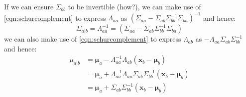 If we can ensure $\Sigma_{bb}$ to be invertible (how?), 
we can make use of \eqref{eqn:schurcomplement} to express
$\Lambda_{aa}$ as
$(\Sigma_{aa}-\Sigma_{ab}\Sigma_{bb}^{-1}\Sigma_{ba})^{-1}$
and hence:
\begin{equation}
\Sigma_{a\vert{}b}=\Lambda_{aa}^{-1}=(\Sigma_{aa}-\Sigma_{ab}\Sigma_{bb}^{-1}\Sigma_{ba})
\label{eqn:covagivenb}    
\end{equation}
we can also make use of \eqref{eqn:schurcomplement} to express
$\Lambda_{ab}$ as
$-\Lambda_{aa}\Sigma_{ab}\Sigma_{bb}^{-1}$
and hence:
\begin{equation}
\begin{split}
\mu_{a\vert{}b}&=\boldsymbol{\mu}_{a}-\Lambda_{aa}^{-1}\Lambda_{ab}(\mathbf{x}_{b}-\boldsymbol{\mu}_{b})\\
&=\boldsymbol{\mu}_{a}+\Lambda_{aa}^{-1}\Lambda_{aa}\Sigma_{ab}\Sigma_{bb}^{-1}(\mathbf{x}_{b}-\boldsymbol{\mu}_{b})\\
&=\boldsymbol{\mu}_{a}+\Sigma_{ab}\Sigma_{bb}^{-1}(\mathbf{x}_{b}-\boldsymbol{\mu}_{b})
\end{split}
\label{eqn:meanagivenb}
\end{equation}
